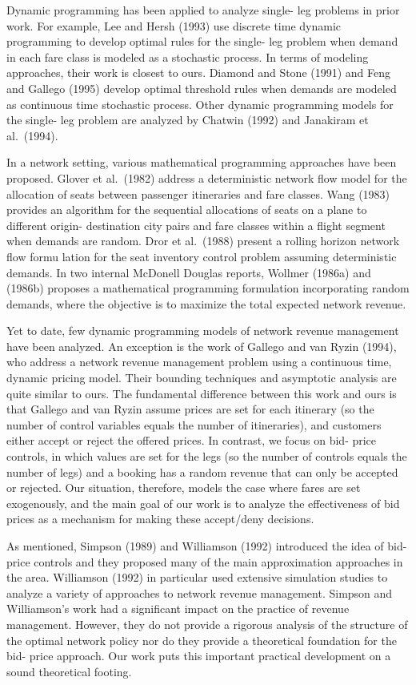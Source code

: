 Dynamic programming has been applied to analyze single- leg problems in
prior work. For example, Lee and Hersh (1993) use discrete time dynamic
programming to develop optimal rules for the single- leg problem when
demand in each fare class is modeled as a stochastic process. In terms
of modeling approaches, their work is closest to ours. Diamond and Stone
(1991) and Feng and Gallego (1995) develop optimal threshold rules when
demands are modeled as continuous time stochastic process. Other dynamic
programming models for the single- leg problem are analyzed by Chatwin
(1992) and Janakiram et al.~(1994).

In a network setting, various mathematical programming approaches have
been proposed. Glover et al.~(1982) address a deterministic network flow
model for the allocation of seats between passenger itineraries and fare
classes. Wang (1983) provides an algorithm for the sequential
allocations of seats on a plane to different origin- destination city
pairs and fare classes within a flight segment when demands are random.
Dror et al.~(1988) present a rolling horizon network flow formu lation
for the seat inventory control problem assuming deterministic demands.
In two internal McDonell Douglas reports, Wollmer (1986a) and (1986b)
proposes a mathematical programming formulation incorporating random
demands, where the objective is to maximize the total expected network
revenue.

Yet to date, few dynamic programming models of network revenue
management have been analyzed. An exception is the work of Gallego and
van Ryzin (1994), who address a network revenue management problem using
a continuous time, dynamic pricing model. Their bounding techniques and
asymptotic analysis are quite similar to ours. The fundamental
difference between this work and ours is that Gallego and van Ryzin
assume prices are set for each itinerary (so the number of control
variables equals the number of itineraries), and customers either accept
or reject the offered prices. In contrast, we focus on bid- price
controls, in which values are set for the legs (so the number of
controls equals the number of legs) and a booking has a random revenue
that can only be accepted or rejected. Our situation, therefore, models
the case where fares are set exogenously, and the main goal of our work
is to analyze the effectiveness of bid prices as a mechanism for making
these accept/deny decisions.

As mentioned, Simpson (1989) and Williamson (1992) introduced the idea
of bid- price controls and they proposed many of the main approximation
approaches in the area. Williamson (1992) in particular used extensive
simulation studies to analyze a variety of approaches to network revenue
management. Simpson and Williamson's work had a significant impact on
the practice of revenue management. However, they do not provide a
rigorous analysis of the structure of the optimal network policy nor do
they provide a theoretical foundation for the bid- price approach. Our
work puts this important practical development on a sound theoretical
footing.

